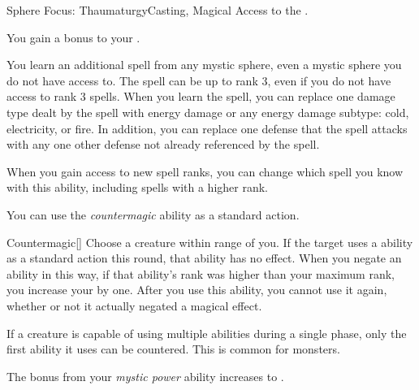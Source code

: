     \begin{magicalfeat}{Sphere Focus: Thaumaturgy}{Casting, Magical}
        \featpre Access to the  .

         You gain a  bonus to your .

         You learn an additional spell from any mystic sphere, even a mystic sphere you do not have access to.
        The spell can be up to rank 3, even if you do not have access to rank 3 spells.
        When you learn the spell, you can replace one damage type dealt by the spell with energy damage or any energy damage subtype: cold, electricity, or fire.
        In addition, you can replace one defense that the spell attacks with any one other defense not already referenced by the spell.

        When you gain access to new spell ranks, you can change which spell you know with this ability, including spells with a higher rank.

         You can use the \textit{countermagic} ability as a standard action.
        \begin{magicalactiveability}{Countermagic}[]
            \rankline
            Choose a creature within \rngmed range of you.
            If the target uses a \magical ability as a standard action this round, that ability has no effect.
            When you negate an ability in this way, if that ability's rank was higher than your maximum rank, you increase your  by one.
            After you use this ability, you  cannot use it again, whether or not it actually negated a magical effect.

            If a creature is capable of using multiple abilities during a single phase, only the first ability it uses can be countered.
            This is common for  monsters.
        \end{magicalactiveability}

         The bonus from your \textit{mystic power} ability increases to .
    \end{magicalfeat}

